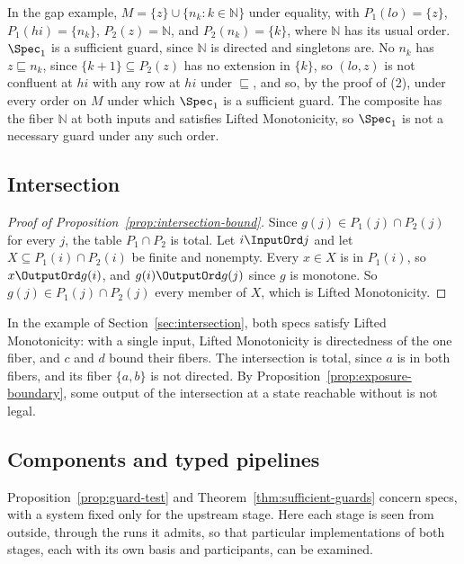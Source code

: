 In the gap example, $M=\{z\}\cup\{n_k:k\in\mathbb N\}$ under equality, with
$P_1(\mathit{lo})=\{z\}$, $P_1(\mathit{hi})=\{n_k\}$, $P_2(z)=\mathbb N$, and
$P_2(n_k)=\{k\}$, where $\mathbb N$ has its usual order.  $\Spec_1$ is a
sufficient guard, since $\mathbb N$ is directed and singletons are.  No $n_k$ has
$z\sqsubseteq n_k$, since $\{k+1\}\subseteq P_2(z)$ has no extension in
$\{k\}$, so $(\mathit{lo},z)$ is not confluent at $\mathit{hi}$ with any row at $\mathit{hi}$
under $\sqsubseteq$, and so, by the proof of (2), under every order on $M$ under
which $\Spec_1$ is a sufficient guard.  The composite has the fiber $\mathbb N$
at both inputs and satisfies Lifted Monotonicity, so $\Spec_1$ is not a
necessary guard under any such order.

\subsection{Intersection}
\label{app:intersection}

\begin{proof}[Proof of Proposition~\ref{prop:intersection-bound}]
Since $g(j)\in P_1(j)\cap P_2(j)$ for every $j$, the table $P_1\cap P_2$ is
total.  Let $i\InputOrd j$ and let $X\subseteq P_1(i)\cap P_2(i)$ be finite and
nonempty.  Every $x\in X$ is in $P_1(i)$, so $x\OutputOrd g(i)$, and
$g(i)\OutputOrd g(j)$ since $g$ is monotone.  So $g(j)\in P_1(j)\cap P_2(j)$
\outrel every member of $X$, which is Lifted Monotonicity.
\end{proof}

In the example of Section~\ref{sec:intersection}, both specs satisfy Lifted
Monotonicity: with a single input, Lifted Monotonicity is directedness of the
one fiber, and $c$ and $d$ bound their fibers.  The intersection is total, since
$a$ is in both fibers, and its fiber $\{a,b\}$ is not directed.  By
Proposition~\ref{prop:exposure-boundary}, some output of the intersection at a
state reachable without \commitment is not legal.

\subsection{Components and typed pipelines}
\label{app:components}

Proposition~\ref{prop:guard-test} and Theorem~\ref{thm:sufficient-guards} concern specs, with a system fixed only
for the upstream stage.  Here each stage is seen from outside, through the
runs it admits, so that particular implementations of both stages, each with
its own basis and participants, can be examined.

